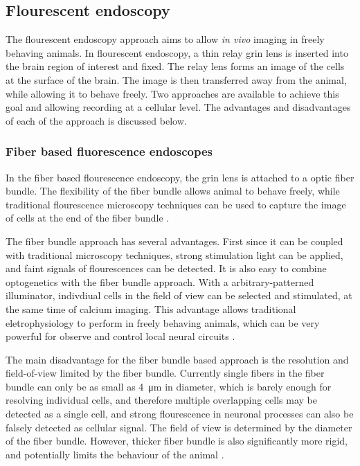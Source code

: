 \subsection{Flourescent endoscopy}

The flourescent endoscopy approach aims to allow \textit{in vivo} imaging in freely behaving animals. In flourescent endoscopy, a thin relay \gls{grin} lens is inserted into the brain region of interest and fixed. The relay lens forms an image of the cells at the surface of the brain. The image is then transferred away from the animal, while allowing it to behave freely. Two approaches are available to achieve this goal and allowing recording at a cellular level. The advantages and disadvantages of each of the approach is discussed below. 

\subsubsection{Fiber based fluorescence endoscopes}
In the fiber based flourescence endoscopy, the \gls{grin} lens is attached to a optic fiber bundle. The flexibility of the fiber bundle allows animal to behave freely, while traditional flourescence microscopy techniques can be used to capture the image of cells at the end of the fiber bundle \citep{flusberg08}. 

The fiber bundle approach has several advantages. First since it can be coupled with traditional microscopy techniques, strong stimulation light can be applied, and faint signals of flourescences can be detected. It is also easy to combine optogenetics with the fiber bundle approach. With a arbitrary-patterned illuminator, indivdiual cells in the field of view can be selected and stimulated, at the same time of calcium imaging. This advantage allows traditional eletrophysiology to perform in freely behaving animals, which can be very powerful for observe and control local neural circuits \citep{szabo14}.

The main disadvantage for the fiber bundle based approach is the resolution and field-of-view limited by the fiber bundle. Currently single fibers in the fiber bundle can only be as small as \SI{4}{\um} in diameter, which is barely enough for resolving individual cells, and therefore multiple overlapping cells may be detected as a single cell, and strong flourescence in neuronal processes can also be falsely detected as cellular signal. The field of view is determined by the diameter of the fiber bundle. However, thicker fiber bundle is also significantly more rigid, and potentially limits the behaviour of the animal \citep{yang17}. 


